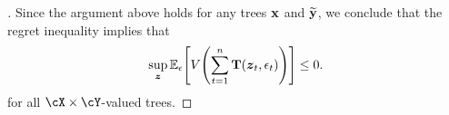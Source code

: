 \begin{proof}[]
Since the argument above holds for any trees $\mathbf{x}$ and $\widetilde{\mathbf{y}}$, we conclude that the regret inequality implies that
\[
\sup_{\mb{z}}\En_{\eps}\brk*{V\prn*{\sum_{t=1}^{n}\suff(\mb{z}_t, \eps_t)}}\leq{}0.
\]
for all $\cX\times{}\cY$-valued trees.

\end{proof}


